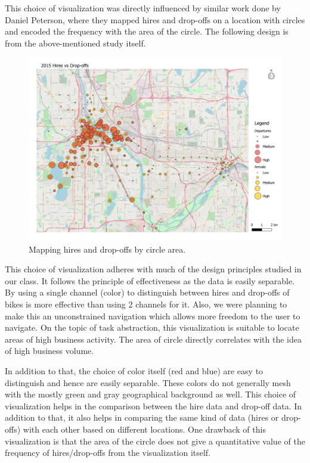This choice of visualization was directly influenced by similar work \cite{UrbanDataCyclist} done by Daniel Peterson, where they mapped hires and drop-offs on a location with circles and encoded the frequency with the area of the circle. The following design is from the above-mentioned study itself.
\begin{figure}[h]
	\centering %
	\includegraphics[scale=0.36]{figs/first_viz.PNG}
	\caption{\footnotesize{Mapping hires and drop-offs by circle area. \cite{UrbanDataCyclist}}}
	\label{fig:First viz Chart}
	\captionsetup{justification=centering,margin=1cm}
	\vspace{-10pt}
\end{figure}
\newline
This choice of visualization adheres with much of the design principles studied in our class. It follows the principle of effectiveness as the data is easily separable. By using a single channel (color) to distinguish between hires and drop-offs of bikes is more effective than using 2 channels for it. Also, we were planning to make this an unconstrained navigation which allows more freedom to the user to navigate. On the topic of task abstraction, this visualization is suitable to locate areas of high business activity. The area of circle directly correlates with the idea of high business volume.

In addition to that, the choice of color itself (red and blue) are easy to distinguish and hence are easily separable. These colors do not generally mesh with the mostly green and gray geographical background as well. This choice of visualization helps in the comparison between the hire data and drop-off data. In addition to that, it also helps in comparing the same kind of data (hires or drop-offs) with each other based on different locations. One drawback of this visualization is that the area of the circle does not give a quantitative value of the frequency of hires/drop-offs from the visualization itself. 

